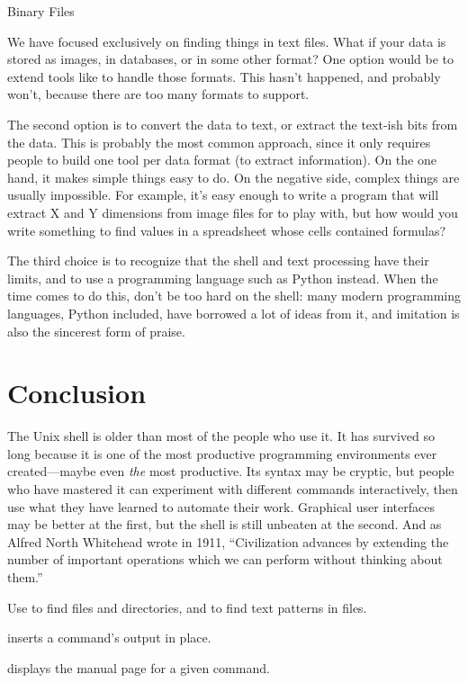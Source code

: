 \begin{swcbox}{Binary Files}

We have focused exclusively on finding things in text files. What if
your data is stored as images, in databases, or in some other format?
One option would be to extend tools like  to handle those
formats. This hasn't happened, and probably won't, because there are too
many formats to support.

The second option is to convert the data to text, or extract the
text-ish bits from the data. This is probably the most common approach,
since it only requires people to build one tool per data format (to
extract information). On the one hand, it makes simple things easy to
do. On the negative side, complex things are usually impossible. For
example, it's easy enough to write a program that will extract X and Y
dimensions from image files for  to play with, but how
would you write something to find values in a spreadsheet whose cells
contained formulas?

The third choice is to recognize that the shell and text processing have
their limits, and to use a programming language such as Python instead.
When the time comes to do this, don't be too hard on the shell: many
modern programming languages, Python included, have borrowed a lot of
ideas from it, and imitation is also the sincerest form of praise.

\end{swcbox}

\section{Conclusion}

The Unix shell is older than most of the people who use it. It has
survived so long because it is one of the most productive programming
environments ever created---maybe even \emph{the} most productive. Its
syntax may be cryptic, but people who have mastered it can experiment
with different commands interactively, then use what they have learned
to automate their work. Graphical user interfaces may be better at the
first, but the shell is still unbeaten at the second. And as Alfred
North Whitehead wrote in 1911, ``Civilization advances by extending the
number of important operations which we can perform without thinking
about them.''

\begin{keypoints}
\begin{swcitemize}
\item
  Use  to find files and directories, and  to
  find text patterns in files.
\item
   inserts a command's output in place.
\item
   displays the manual page for a given command.
\end{swcitemize}
\end{keypoints}

